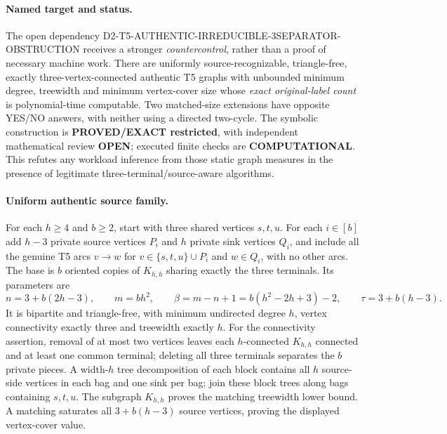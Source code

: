 \documentclass[11pt]{article}
\begin{document}
\paragraph{Named target and status.}
The open dependency D2-T5-AUTHENTIC-IRREDUCIBLE-3SEPARATOR-OBSTRUCTION
receives a stronger \emph{countercontrol}, rather than a proof of
necessary machine work. There are uniformly source-recognizable,
triangle-free, exactly three-vertex-connected authentic T5 graphs
with unbounded minimum degree, treewidth and minimum vertex-cover size
whose \emph{exact original-label count} is polynomial-time computable.
Two matched-size extensions have opposite YES/NO answers, with
neither using a directed two-cycle. The symbolic construction is
\textbf{PROVED/EXACT restricted}, with independent mathematical
review \textbf{OPEN}; executed finite checks are \textbf{COMPUTATIONAL}.
This refutes any workload inference from those static graph measures
in the presence of legitimate three-terminal/source-aware algorithms.

\paragraph{Uniform authentic source family.}
For each $h\ge4$ and $b\ge2$, start with three shared vertices
$s,t,u$. For each $i\in[b]$ add $h-3$ private source vertices
$P_i$ and $h$ private sink vertices $Q_i$, and include all the genuine
T5 arcs $v\to w$ for
$v\in\{s,t,u\}\cup P_i$ and $w\in Q_i$, with no other arcs.
The base is $b$ oriented copies of $K_{h,h}$ sharing exactly
the three terminals. Its parameters are
\[
n=3+b(2h-3),\qquad m=bh^2,\qquad
\beta=m-n+1=b(h^2-2h+3)-2,\qquad
\tau=3+b(h-3).
\]
It is bipartite and triangle-free, with minimum undirected degree
$h$, vertex connectivity exactly three and treewidth exactly $h$.
For the connectivity assertion, removal of at most two vertices
leaves each $h$-connected $K_{h,h}$ connected and at least
one common terminal; deleting all three terminals separates
the $b$ private pieces. A width-$h$ tree decomposition of
each block contains all $h$ source-side vertices in each bag
and one sink per bag; join these block trees along bags containing
$s,t,u$. The subgraph $K_{h,h}$ proves the matching treewidth
lower bound. A matching saturates all $3+b(h-3)$ source vertices,
proving the displayed vertex-cover value.
\end{document}
